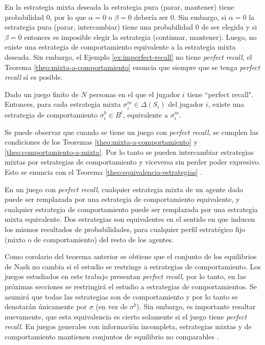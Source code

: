 En la estrategia mixta deseada la estrategia pura (parar, mantener) tiene probabilidad $0$, por lo que $\alpha = 0$ o $\beta = 0$ debería ser $0$. Sin embargo, si $\alpha = 0$ la estrategia pura (parar, intercambiar) tiene una probabilidad $0$ de ser elegida y si $\beta = 0$ entonces es imposible elegir la estrategia (continuar, mantener). Luego, no existe una estrategia de comportamiento equivalente a la estrategia mixta deseada. Sin embargo, el Ejemplo \ref{ex:imperfect-recall} no tiene \textit{perfect recall}, el Teorema \ref{theo:mixta-a-comportamiento} enuncia que siempre que se tenga \textit{perfect recall} sí es posible.

\begin{theorem}
\label{theo:mixta-a-comportamiento}
Dado un juego finito de $N$ personas en el que el jugador $i$ tiene ``perfect recall". Entonces, para cada estrategia mixta $\sigma^m_i \in \Delta(S_i)$ del jugador $i$, existe una estrategia de comportamiento $\sigma^b_i \in B^i$, equivalente a $\sigma^m_i$.
\end{theorem}


Se puede observar que cuando se tiene un juego con \textit{perfect recall}, se cumplen las condiciones de los Teoremas \ref{theo:mixta-a-comportamiento} y \ref{theo:comportamiento-a-mixta}. Por lo tanto se pueden intercambiar estrategias mixtas por estrategias de comportamiento y viceversa sin perder poder expresivo. Esto se enuncia con el Teorema \ref{theo:equivalencia-estrategias} \cite[p.~45]{bib:handbook-blai}.

\begin{theorem}
\label{theo:equivalencia-estrategias}
En un juego con \textit{perfect recall}, cualquier estrategia mixta de un agente dado puede ser remplazada por una estrategia de comportamiento equivalente, y cualquier estrategia de comportamiento puede ser remplazada por una estrategia mixta equivalente. Dos estrategias son equivalentes en el sentido en que inducen los mismos resultados de probabilidades, para cualquier perfil estratégico fijo (mixto o de comportamiento) del resto de los agentes.
\end{theorem}

Como corolario del teorema anterior se obtiene que el conjunto de los equilibrios de Nash no cambia si el estudio se restringe a estrategias de comportamiento. Los juegos estudiados en este trabajo presentan \textit{perfect recall}, por lo tanto, en las próximas secciones se restringirá el estudio a estrategias de comportamientos. Se asumirá que todas las estrategias son de comportamiento y por lo tanto se denotarán únicamente por $\sigma$ (en vez de $\sigma^b$). Sin embargo, es importante resaltar nuevamente, que esta equivalencia es cierto solamente si el juego tiene \textit{perfect recall}. En juegos generales con información incompleta, estrategias mixtas y de comportamiento mantienen conjuntos de equilibrio no comparables \cite[p.~45]{bib:handbook-blai}.

